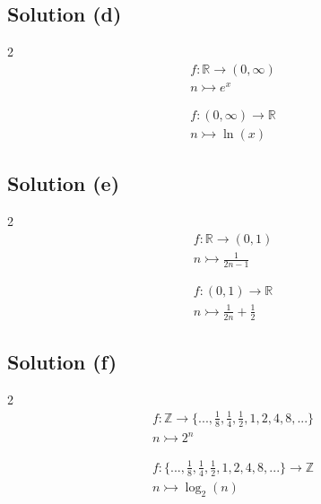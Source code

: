 \documentclass[12pt]{report}
\begin{document}
\subsection{Solution (d)}
\begin{multicols}{2}
    \begin{gather}
        f : \mathbb{R} \to (0, \infty)\\
        n \rightarrowtail e^x
    \end{gather}

    \columnbreak
    \begin{gather}
        f : (0, \infty) \to \mathbb{R}\\
        n \rightarrowtail \ln(x)
    \end{gather}
\end{multicols}

\subsection{Solution (e)}
\begin{multicols}{2}
    \begin{gather}
        f : \mathbb{R} \to (0, 1)\\
        n \rightarrowtail \frac{1}{2n - 1}
    \end{gather}

    \columnbreak
    \begin{gather}
        f : (0, 1) \to \mathbb{R}\\
        n \rightarrowtail \frac{1}{2n} + \frac{1}{2}
    \end{gather}
\end{multicols}

\subsection{Solution (f)}
\begin{multicols}{2}
    \begin{gather}
        f : \mathbb{Z} \to \{ ..., \frac{1}{8}, \frac{1}{4}, \frac{1}{2}, 1, 2, 4, 8, ... \}\\
        n \rightarrowtail 2^n
    \end{gather}

    \columnbreak
    \begin{gather}
        f : \{ ..., \frac{1}{8}, \frac{1}{4}, \frac{1}{2}, 1, 2, 4, 8, ... \} \to \mathbb{Z}\\
        n \rightarrowtail \log_2 (n)
    \end{gather}
\end{multicols}
\end{document}
